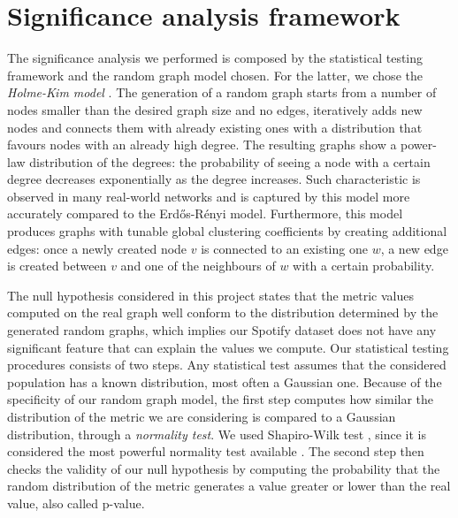 \section{Significance analysis framework}

The significance analysis we performed is composed by the statistical testing framework and the random graph model chosen. For the latter, we chose the \emph{Holme-Kim model} \cite{Holme2002}. The generation of a random graph starts from a number of nodes smaller than the desired graph size and no edges, iteratively adds new nodes and connects them with already existing ones with a distribution that favours nodes with an already high degree. The resulting graphs show a power-law distribution of the degrees: the probability of seeing a node with a certain degree decreases exponentially as the degree increases. Such characteristic is observed in many real-world networks and is captured by this model more accurately compared to the Erd\H{o}s-R\'{e}nyi model. Furthermore, this model produces graphs with tunable global clustering coefficients by creating additional edges: once a newly created node $v$ is connected to an existing one $w$, a new edge is created between $v$ and one of the neighbours of $w$ with a certain probability.

The null hypothesis considered in this project states that the metric values computed on the real graph well conform to the distribution determined by the generated random graphs, which implies our Spotify dataset does not have any significant feature that can explain the values we compute. Our statistical testing procedures consists of two steps. Any statistical test assumes that the considered population has a known distribution, most often a Gaussian one. Because of the specificity of our random graph model, the first step computes how similar the distribution of the metric we are considering is compared to a Gaussian distribution, through a \emph{normality test}. We used Shapiro-Wilk test \cite{ShapiroWilk1965}, since it is considered the most powerful normality test available \cite{RazaliYap2011}. The second step then checks the validity of our null hypothesis by computing the probability that the random distribution of the metric generates a value greater or lower than the real value, also called p-value.